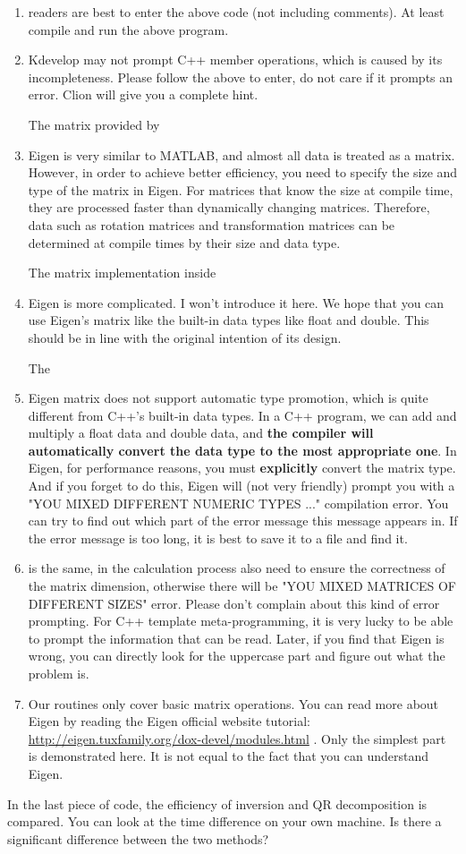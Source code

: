 \begin{enumerate}
	\item readers are best to enter the above code (not including comments). At least compile and run the above program.
	
	\item Kdevelop may not prompt C++ member operations, which is caused by its incompleteness. Please follow the above to enter, do not care if it prompts an error. Clion will give you a complete hint.
	
	The matrix provided by \item Eigen is very similar to MATLAB, and almost all data is treated as a matrix. However, in order to achieve better efficiency, you need to specify the size and type of the matrix in Eigen. For matrices that know the size at compile time, they are processed faster than dynamically changing matrices. Therefore, data such as rotation matrices and transformation matrices can be determined at compile times by their size and data type.
	
	The matrix implementation inside \item Eigen is more complicated. I won't introduce it here. We hope that you can use Eigen's matrix like the built-in data types like float and double. This should be in line with the original intention of its design.
	
	The \item Eigen matrix does not support automatic type promotion, which is quite different from C++'s built-in data types. In a C++ program, we can add and multiply a float data and double data, and \textbf{the compiler will automatically convert the data type to the most appropriate one}. In Eigen, for performance reasons, you must \textbf{explicitly} convert the matrix type. And if you forget to do this, Eigen will (not very friendly) prompt you with a "YOU MIXED DIFFERENT NUMERIC TYPES ..." compilation error. You can try to find out which part of the error message this message appears in. If the error message is too long, it is best to save it to a file and find it.
	
	\item is the same, in the calculation process also need to ensure the correctness of the matrix dimension, otherwise there will be "YOU MIXED MATRICES OF DIFFERENT SIZES" error. Please don't complain about this kind of error prompting. For C++ template meta-programming, it is very lucky to be able to prompt the information that can be read. Later, if you find that Eigen is wrong, you can directly look for the uppercase part and figure out what the problem is.
	
	\item Our routines only cover basic matrix operations. You can read more about Eigen by reading the Eigen official website tutorial: \\ { \url{http://eigen.tuxfamily.org/dox-devel/modules.html} }. Only the simplest part is demonstrated here. It is not equal to the fact that you can understand Eigen.
\end{enumerate}

In the last piece of code, the efficiency of inversion and QR decomposition is compared. You can look at the time difference on your own machine. Is there a significant difference between the two methods?
